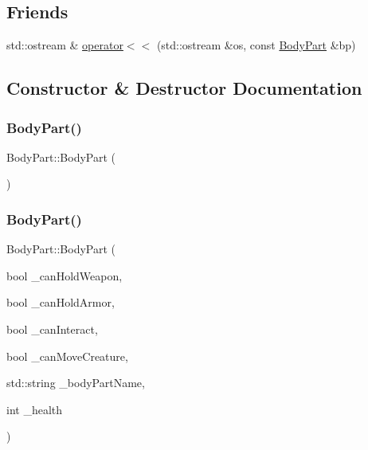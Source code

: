 \subsection*{Friends}
\begin{DoxyCompactItemize}
\item 
std\+::ostream \& \mbox{\hyperlink{class_body_part_a816ee6d41ee84f770c140a51243cc152}{operator$<$$<$}} (std\+::ostream \&os, const \mbox{\hyperlink{class_body_part}{Body\+Part}} \&bp)
\end{DoxyCompactItemize}


\subsection{Constructor \& Destructor Documentation}
\mbox{\label{class_body_part_a9599eb919a1223d5597f85fedd74085a}} 
\subsubsection{\texorpdfstring{Body\+Part()}{BodyPart()}\hspace{0.1cm}{\footnotesize\ttfamily [1/4]}}
{\footnotesize\ttfamily Body\+Part\+::\+Body\+Part (\begin{DoxyParamCaption}{ }\end{DoxyParamCaption})}

\mbox{\label{class_body_part_a84e12a892612a548a4fd605835290557}} 
\subsubsection{\texorpdfstring{Body\+Part()}{BodyPart()}\hspace{0.1cm}{\footnotesize\ttfamily [2/4]}}
{\footnotesize\ttfamily Body\+Part\+::\+Body\+Part (\begin{DoxyParamCaption}\item[{bool}]{\+\_\+can\+Hold\+Weapon,  }\item[{bool}]{\+\_\+can\+Hold\+Armor,  }\item[{bool}]{\+\_\+can\+Interact,  }\item[{bool}]{\+\_\+can\+Move\+Creature,  }\item[{std\+::string}]{\+\_\+body\+Part\+Name,  }\item[{int}]{\+\_\+health }\end{DoxyParamCaption})}

